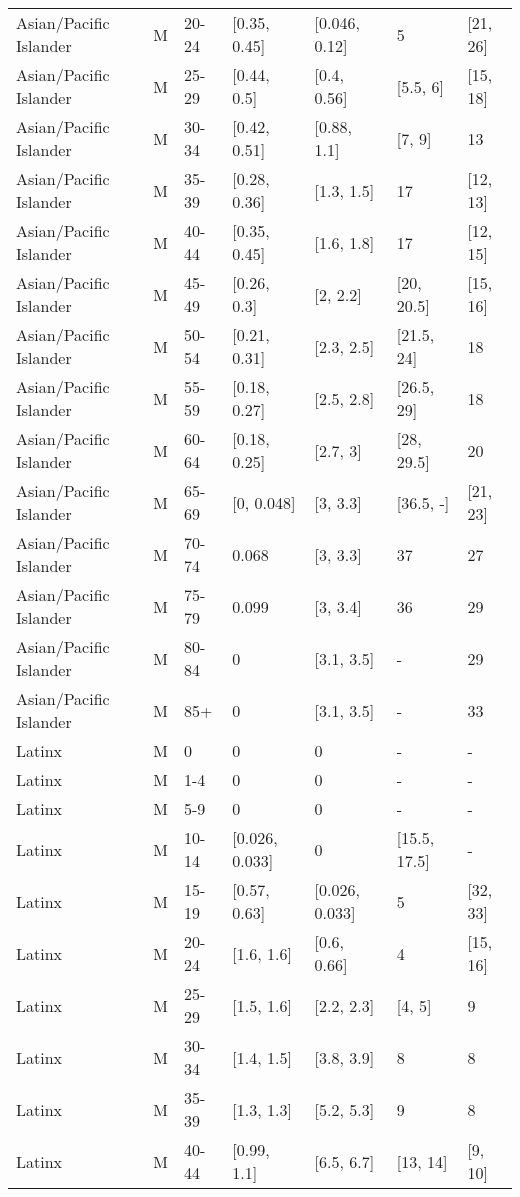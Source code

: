 \begin{table}[ht]
\begin{tabular}{lllllll}
  Asian/Pacific Islander & M & 20-24 & [0.35, 0.45] & [0.046, 0.12] & 5 & [21, 26] \\ 
  Asian/Pacific Islander & M & 25-29 & [0.44, 0.5] & [0.4, 0.56] & [5.5, 6] & [15, 18] \\ 
  Asian/Pacific Islander & M & 30-34 & [0.42, 0.51] & [0.88, 1.1] & [7, 9] & 13 \\ 
  Asian/Pacific Islander & M & 35-39 & [0.28, 0.36] & [1.3, 1.5] & 17 & [12, 13] \\ 
  Asian/Pacific Islander & M & 40-44 & [0.35, 0.45] & [1.6, 1.8] & 17 & [12, 15] \\ 
  Asian/Pacific Islander & M & 45-49 & [0.26, 0.3] & [2, 2.2] & [20, 20.5] & [15, 16] \\ 
  Asian/Pacific Islander & M & 50-54 & [0.21, 0.31] & [2.3, 2.5] & [21.5, 24] & 18 \\ 
  Asian/Pacific Islander & M & 55-59 & [0.18, 0.27] & [2.5, 2.8] & [26.5, 29] & 18 \\ 
  Asian/Pacific Islander & M & 60-64 & [0.18, 0.25] & [2.7, 3] & [28, 29.5] & 20 \\ 
  Asian/Pacific Islander & M & 65-69 & [0, 0.048] & [3, 3.3] & [36.5, -] & [21, 23] \\ 
  Asian/Pacific Islander & M & 70-74 & 0.068 & [3, 3.3] & 37 & 27 \\ 
  Asian/Pacific Islander & M & 75-79 & 0.099 & [3, 3.4] & 36 & 29 \\ 
  Asian/Pacific Islander & M & 80-84 & 0 & [3.1, 3.5] & - & 29 \\ 
  Asian/Pacific Islander & M & 85+ & 0 & [3.1, 3.5] & - & 33 \\ 
  Latinx & M & 0 & 0 & 0 & - & - \\ 
  Latinx & M & 1-4 & 0 & 0 & - & - \\ 
  Latinx & M & 5-9 & 0 & 0 & - & - \\ 
  Latinx & M & 10-14 & [0.026, 0.033] & 0 & [15.5, 17.5] & - \\ 
  Latinx & M & 15-19 & [0.57, 0.63] & [0.026, 0.033] & 5 & [32, 33] \\ 
  Latinx & M & 20-24 & [1.6, 1.6] & [0.6, 0.66] & 4 & [15, 16] \\ 
  Latinx & M & 25-29 & [1.5, 1.6] & [2.2, 2.3] & [4, 5] & 9 \\ 
  Latinx & M & 30-34 & [1.4, 1.5] & [3.8, 3.9] & 8 & 8 \\ 
  Latinx & M & 35-39 & [1.3, 1.3] & [5.2, 5.3] & 9 & 8 \\ 
  Latinx & M & 40-44 & [0.99, 1.1] & [6.5, 6.7] & [13, 14] & [9, 10] \\ 

\end{tabular}
\end{table}
